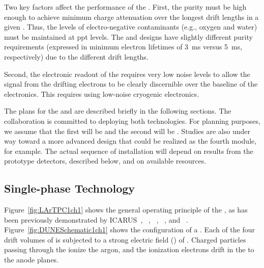 Two key factors affect the performance of the  .  First, the  purity must be high enough to achieve minimum charge attenuation over the longest drift lengths in a given .  Thus, the levels of electro-negative contaminants (e.g., oxygen and water) must be maintained at ppt levels.  The  and  designs have slightly different purity requirements (expressed in minimum electron lifetimes of \SI{3}{ms} versus \SI{5}{ms}, respectively) due to the different drift lengths.

Second, the electronic readout of the  requires very low noise levels to allow the signal from the drifting electrons to be clearly discernible over the baseline of the electronics.  This requires using low-noise cryogenic electronics. 

The plans for the  and   are described briefly in the following sections. 
The  collaboration is committed to deploying both technologies.
For planning purposes, we assume that the first  will be
 and the second will be .
%
Studies are also under way toward a more advanced  design that could be realized as 
the fourth module, for example. 
%
The actual sequence of  installation will depend on results from the prototype detectors, described below, and on available resources.


\subsection{Single-phase Technology}
\label{sec:physics-intro-dunefd-splar}

Figure~\ref{fig:LArTPC1ch1} shows the general operating principle of the  , as has been previously demonstrated by ICARUS~\cite{Icarus-T600}, ~\cite{microboone}, ~\cite{Anderson:2012vc}, ~\cite{Cavanna:2014iqa}, and ~\cite{Abi:2017aow}. Figure~\ref{fig:DUNESchematic1ch1} shows the configuration of a  . Each of the four drift volumes of  is subjected to a strong electric field (\efield{}) of \spmaxfield. Charged particles passing through the  ionize the argon, and the ionization electrons drift in the \efield to the anode planes. 



